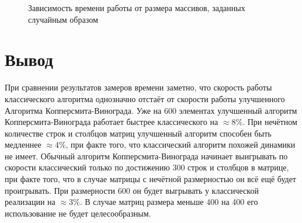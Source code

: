 \documentclass[12pt]{report}
\begin{document}
\begin{figure}[h]
\begin{center}
	\captionsetup{justification=centering}
	\caption{Зависимость времени работы от размера массивов, заданных случайным образом}
	\label{timeRes3}
	\end{center}
\end{figure}

\section*{Вывод}
При сравнении результатов замеров времени заметно, что скорость работы классического алгоритма однозначно отстаёт от скорости работы улучшенного Алгоритма Копперсмита-Винограда. Уже на 600 элементах улучшенный алгоритм Копперсмита-Винограда работает быстрее классического на $\approx8\%$. При нечётном количестве строк и столбцов матриц улучшенный алгоритм способен быть медленнее $\approx4\%$, при факте того, что классический алгоритм похожей динамики не имеет. Обычный алгоритм Копперсмита-Винограда начинает выигрывать по скорости классический только по достижению 300 строк и столбцов в матрице, при факте того, что в случае матрицы с нечётной размерностью он всё ещё будет проигрывать. При размерности 600 он будет выгрывать у классической реализации на $\approx3\%$. В случае матриц размера меньше 400 на 400 его использование не будет целесообразным.
\end{document}
